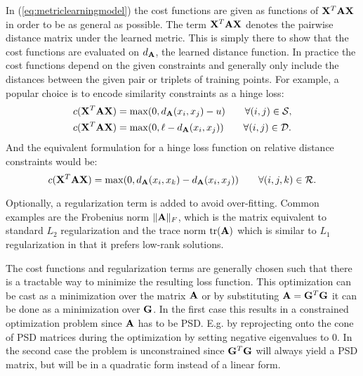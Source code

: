 In (\ref{eq:metriclearningmodel}) the cost functions are given as functions of $\mathbf{X}^T\mathbf{A}\mathbf{X}$ in order to be as general as possible. The term $\mathbf{X}^T\mathbf{A}\mathbf{X}$ denotes the pairwise distance matrix under the learned metric. This is simply there to show that the cost functions are evaluated on $d_{\mathbf{A}}$, the learned distance function. In practice the cost functions depend on the given constraints and generally only include the distances between the given pair or triplets of training points. For example, a popular choice is to encode similarity constraints as a hinge loss: 
\begin{align}
c(\mathbf{X}^T\mathbf{A}\mathbf{X}) &= \max(0,d_{\mathbf{A}}(x_i, x_j) - u) \qquad \forall (i,j) \in \mathcal{S}, \\
c(\mathbf{X}^T\mathbf{A}\mathbf{X}) &= \max(0,\ell - d_{\mathbf{A}}(x_i, x_j)) \qquad \forall (i,j) \in \mathcal{D}.
\end{align}
And the equivalent formulation for a hinge loss function on relative distance constraints would be:
\begin{equation}
c(\mathbf{X}^T\mathbf{A}\mathbf{X}) = \max(0,d_{\mathbf{A}}(x_i, x_k) - d_{\mathbf{A}}(x_i, x_j)) \qquad \forall (i,j,k) \in \mathcal{R}.
\end{equation}

Optionally, a regularization term is added to avoid over-fitting. Common examples are the Frobenius norm $\|\mathbf{A}\|_F$, which is the matrix equivalent to standard $L_2$ regularization and the trace norm $\text{tr}(\mathbf{A})$ which is similar to $L_1$ regularization in that it prefers low-rank solutions.

The cost functions and regularization terms are generally chosen such that there is a tractable way to minimize the resulting loss function. This optimization can be cast as a minimization over the matrix $\mathbf{A}$ or by substituting $\mathbf{A} = \mathbf{G}^T\mathbf{G}$ it can be done as a minimization over $\mathbf{G}$. In the first case this results in a constrained optimization problem since $\mathbf{A}$ has to be \ac{PSD}. E.g. by reprojecting onto the cone of \ac{PSD} matrices during the optimization  by setting negative eigenvalues to 0. In the second case the problem is unconstrained since $\mathbf{G}^T\mathbf{G}$ will always yield a \ac{PSD} matrix, but will be in a quadratic form instead of a linear form.










